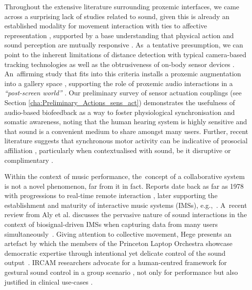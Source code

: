 {Throughout the extensive literature surrounding proxemic interfaces, we came across a surprising lack of studies related to sound, given this is already an established modality for movement interaction with ties to affective representation \citep{landry_interactive_2020}, supported by a base understanding that physical action and sound perception are mutually responsive \citep{krzyzaniak_six_2019}. As~a tentative presumption, we can point to the inherent limitations of distance detection with typical camera-based tracking technologies \citep{wu_out_2017} as well as the obtrusiveness of on-body sensor devices \citep{hensel_defining_2006}. An~affirming study that fits into this criteria installs a proxemic augmentation into a gallery space \citep{rector_eyes-free_2017}, supporting the role of proxemic audio interactions in a \textit{``post-screen world''} \citep{bryan-kinns_interaction_2017}. Our preliminary survey of sensor actuation couplings (see Section \ref{cha:Preliminary_Actions_sens_act}) demonstrates the usefulness of audio-based biofeedback as a way to foster physiological synchronisation and somatic awareness, noting that the human hearing system is highly sensitive and that sound is a convenient medium to share amongst many users. Further, recent literature suggests that synchronous motor activity can be indicative of prosocial affiliation \cite{hadley_synchrony_2021}, particularly when contextualised with sound, be it disruptive or complimentary \cite{solberg_group_2019}.


Within the context of music performance, the~concept of a collaborative system is not a novel phenomenon, far from it in fact. Reports date back as far as 1978 \citep{bischoff_music_1978} with progressions to real-time remote interaction \citep{barbosa_displaced_2003}, later supporting the establishment and maturity of interactive music systems (IMSs), e.g.,~\citep{jorda_reactable_2007,freeman_auracle_2005}. A~recent review from  Aly et al. %
discusses the pervasive nature of sound interactions in the context of biosignal-driven IMSs when capturing data from many users simultaneously~\cite{aly_appropriating_2021}. Giving attention to collective movement,  Hege presents an artefact by which the members of the Princeton Laptop Orchestra showcase democratic expertise through intentional yet delicate control of the sound output~\cite{hege_spirit_2014}. IRCAM researchers advocate for a human-centred framework for gestural sound control in a group scenario \citep{schnell_collective_2015}, not only for performance but also justified in clinical use-cases \citep{bevilacqua_exploring_2018}.

}
